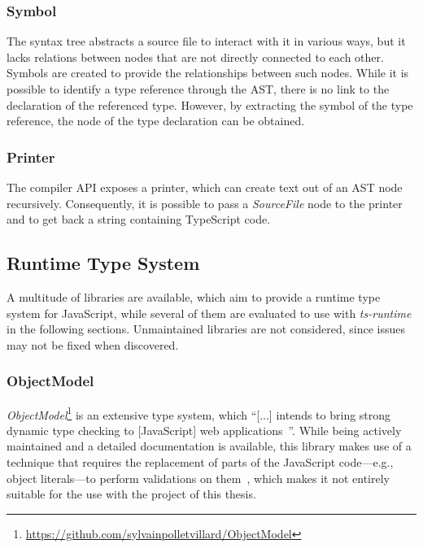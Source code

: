 \subsubsection{Symbol}

The syntax tree abstracts a source file to interact with it in various ways, but it lacks relations between nodes that are not directly connected to each other. Symbols are created to provide the relationships between such nodes. While it is possible to identify a type reference through the AST, there is no link to the declaration of the referenced type. However, by extracting the symbol of the type reference, the node of the type declaration can be obtained.

\subsubsection{Printer}

The compiler API exposes a printer, which can create text out of an AST node recursively. Consequently, it is possible to pass a \emph{SourceFile} node to the printer and to get back a string containing TypeScript code.

\subsection{Runtime Type System}
\label{sec:runtime-type-system}

A multitude of libraries are available, which aim to provide a runtime type system for JavaScript, while several of them are evaluated to use with \emph{ts-runtime} in the following sections. Unmaintained libraries are not considered, since issues may not be fixed when discovered.

\subsubsection{ObjectModel}

\emph{ObjectModel}\footnote{\url{https://github.com/sylvainpolletvillard/ObjectModel}} is an extensive type system, which ``[...] intends to bring strong dynamic type checking to [JavaScript] web applications~\cite{RuntimeTypeSystem:ObjectModel}''. While being actively maintained and a detailed documentation is available, this library makes use of a technique that requires the replacement of parts of the JavaScript code---e.g., object literals---to perform validations on them~\cite{RuntimeTypeSystem:ObjectModel}, which makes it not entirely suitable for the use with the project of this thesis.

